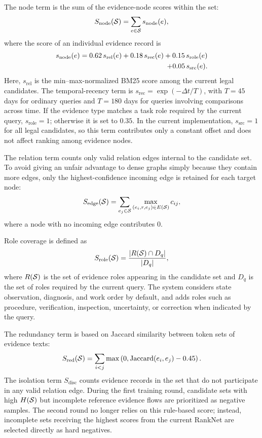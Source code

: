 The node term is the sum of the evidence-node scores within the set:
\begin{equation}
S_{\mathrm{node}}(\mathcal{S})
=
\sum_{e\in\mathcal{S}}s_{\mathrm{node}}(e),
\end{equation}
where the score of an individual evidence record is
\begin{align}
s_{\mathrm{node}}(e)
=
0.62\,s_{\mathrm{rel}}(e)
+0.18\,s_{\mathrm{rec}}(e)
+0.15\,s_{\mathrm{role}}(e) \\
+0.05\,s_{\mathrm{src}}(e). \notag
\end{align}
Here, $s_{\mathrm{rel}}$ is the min--max-normalized BM25 score among the current legal candidates.
The temporal-recency term is $s_{\mathrm{rec}}=\exp(-\Delta t/T)$, with $T=45$ days for ordinary queries and $T=180$ days for queries involving comparisons across time.
If the evidence type matches a task role required by the current query, $s_{\mathrm{role}}=1$; otherwise it is set to $0.35$.
In the current implementation, $s_{\mathrm{src}}=1$ for all legal candidates, so this term contributes only a constant offset and does not affect ranking among evidence nodes.

The relation term counts only valid relation edges internal to the candidate set. To avoid giving an unfair advantage to dense graphs simply because they contain more edges, only the highest-confidence incoming edge is retained for each target node:
\begin{equation}
S_{\mathrm{edge}}(\mathcal{S})
=
\sum_{e_j\in\mathcal{S}}
\max_{(e_i,r,e_j)\in E(\mathcal{S})}c_{ij},
\end{equation}
where a node with no incoming edge contributes 0.

Role coverage is defined as
\begin{equation}
S_{\mathrm{role}}(\mathcal{S})
=
\frac{|R(\mathcal{S})\cap D_q|}{|D_q|},
\end{equation}
where $R(\mathcal{S})$ is the set of evidence roles appearing in the candidate set and $D_q$ is the set of roles required by the current query. The system considers state observation, diagnosis, and work order by default, and adds roles such as procedure, verification, inspection, uncertainty, or correction when indicated by the query.

The redundancy term is based on Jaccard similarity between token sets of evidence texts:
\begin{equation}
S_{\mathrm{red}}(\mathcal{S})
=
\sum_{i<j}
\max\left(
0,
\operatorname{Jaccard}(e_i,e_j)-0.45
\right).
\end{equation}
The isolation term $S_{\mathrm{disc}}$ counts evidence records in the set that do not participate in any valid relation edge.
During the first training round, candidate sets with high $H(\mathcal{S})$ but incomplete reference evidence flows are prioritized as negative samples. The second round no longer relies on this rule-based score; instead, incomplete sets receiving the highest scores from the current RankNet are selected directly as hard negatives.

